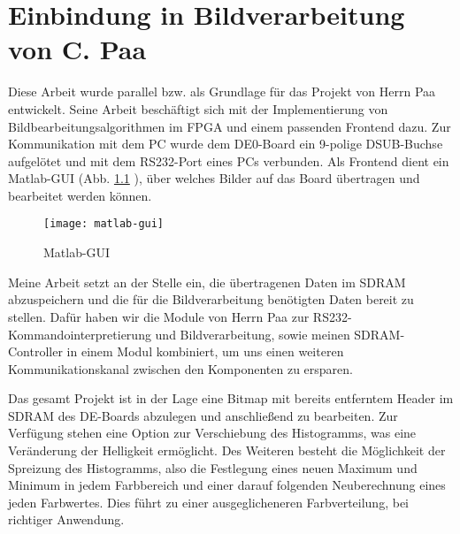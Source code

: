 \chapter{Einbindung in Bildverarbeitung von C. Paa}
\label{cha:Paa}

Diese Arbeit wurde parallel bzw. als Grundlage für das Projekt von Herrn Paa entwickelt. Seine Arbeit beschäftigt sich mit der Implementierung von Bildbearbeitungsalgorithmen im FPGA und einem passenden Frontend dazu.
Zur Kommunikation mit dem PC wurde dem DE0-Board ein 9-polige DSUB-Buchse aufgelötet und mit dem RS232-Port eines PCs verbunden. Als Frontend dient ein Matlab-GUI (Abb. \ref{fig:GUI} ), über welches Bilder auf das Board übertragen und bearbeitet werden können.

\begin{figure}[h!]
\centering
\texttt{[image: matlab-gui]} %
\caption{Matlab-GUI}
\label{fig:GUI}
\end{figure}
\FloatBarrier

Meine Arbeit setzt an der Stelle ein, die übertragenen Daten im SDRAM abzuspeichern und die für die Bildverarbeitung benötigten Daten bereit zu stellen. Dafür haben wir die Module von Herrn Paa zur RS232-Kommandointerpretierung und Bildverarbeitung, sowie meinen SDRAM-Controller in einem Modul kombiniert, um uns einen weiteren Kommunikationskanal zwischen den Komponenten zu ersparen.

Das gesamt Projekt ist in der Lage eine Bitmap mit bereits entferntem Header im SDRAM des DE-Boards abzulegen und anschließend zu bearbeiten. Zur Verfügung stehen eine Option zur Verschiebung des Histogramms, was eine Veränderung der Helligkeit ermöglicht. Des Weiteren besteht die Möglichkeit der Spreizung des Histogramms, also die Festlegung eines neuen Maximum und Minimum in jedem Farbbereich und einer darauf folgenden Neuberechnung eines jeden Farbwertes. Dies führt zu einer ausgeglicheneren Farbverteilung, bei richtiger Anwendung.